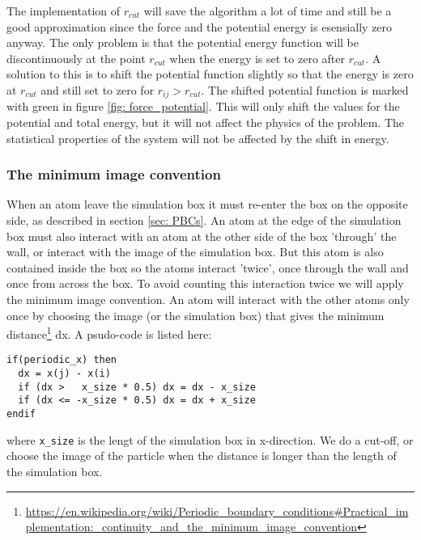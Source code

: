\documentclass[11pt,a4wide]{article}
\begin{document}
The implementation of $r_{cut}$ will save the algorithm a lot of time and still be a good approximation since the force and the potential energy is esensially zero anyway. The only problem is that the potential energy function will be discontinuously at the point $r_{cut}$ when the energy is set to zero after $r_{cut}$. A solution to this is to shift the potential function slightly so that the energy is zero at $r_{cut}$ and still set to zero for $r_{ij}>r_{cut}$. The shifted potential function is marked with green in figure \ref{fig: force_potential}. This will only shift the values for the potential and total energy, but it will not affect the physics of the problem. The statistical properties of the system will not be affected by the shift in energy. 


\subsubsection*{The minimum image convention} 
When an atom leave the simulation box it must re-enter the box on the opposite side, as described in section \ref{sec: PBCs}. An atom at the edge of the simulation box must also interact with an atom at the other side of the box 'through' the wall, or interact with the image of the simulation box. But this atom is also contained inside the box so the atoms interact 'twice', once through the wall and once from across the box. To avoid counting this interaction twice we will apply the minimum image convention. An atom will interact with the other atoms only once by choosing the image (or the simulation box) that gives the minimum distance\footnote{\url{https://en.wikipedia.org/wiki/Periodic\_boundary\_conditions\#Practical\_implementation:\_continuity\_and\_the\_minimum\_image\_convention}} dx. A psudo-code is listed here:

\begin{lstlisting}
if(periodic_x) then
  dx = x(j) - x(i)
  if (dx >   x_size * 0.5) dx = dx - x_size
  if (dx <= -x_size * 0.5) dx = dx + x_size
endif
\end{lstlisting}
where \texttt{x\_size} is the lengt of the simulation box in x-direction. We do a cut-off, or choose the image of the particle when the distance is longer than the length of the simulation box.
\end{document}
